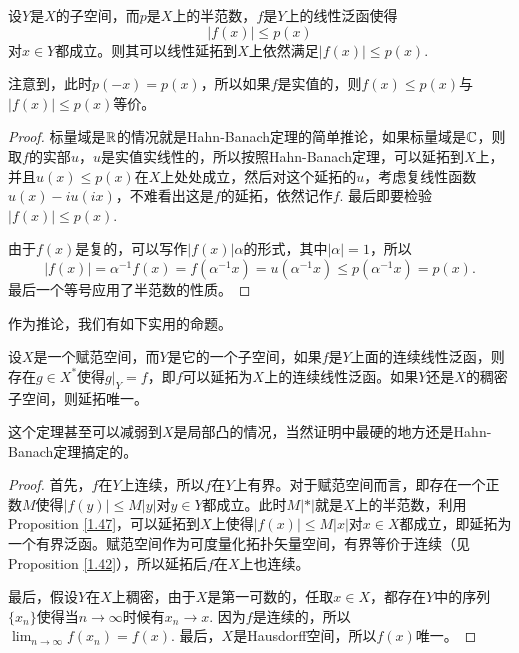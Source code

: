 \begin{pro}\label{1.47}
	设$Y$是$X$的子空间，而$p$是$X$上的半范数，$f$是$Y$上的线性泛函使得
	\[
	|f(x)|\leq p(x)
	\]
	对$x\in Y$都成立。则其可以线性延拓到$X$上依然满足$|f(x)|\leq p(x)$.
\end{pro}

注意到，此时$p(-x)=p(x)$，所以如果$f$是实值的，则$f(x)\leq p(x)$与$|f(x)|\leq p(x)$等价。

\begin{proof}
	标量域是$\mathbb{R}$的情况就是Hahn-Banach定理的简单推论，如果标量域是$\mathbb{C}$，则取$f$的实部$u$，$u$是实值实线性的，所以按照Hahn-Banach定理，可以延拓到$X$上，并且$u(x)\leq p(x)$在$X$上处处成立，然后对这个延拓的$u$，考虑复线性函数$u(x)-i u(i x)$，不难看出这是$f$的延拓，依然记作$f$. 最后即要检验$|f(x)|\leq p(x)$.

	由于$f(x)$是复的，可以写作$|f(x)|\alpha$的形式，其中$|\alpha|=1$，所以
	\[
	|f(x)|=\alpha^{-1}f(x)=f(\alpha^{-1}x)=u(\alpha^{-1}x)\leq p(\alpha^{-1}x)=p(x).
	\]
	最后一个等号应用了半范数的性质。
\end{proof}

作为推论，我们有如下实用的命题。

\begin{pro}\label{1.52}
	设$X$是一个赋范空间，而$Y$是它的一个子空间，如果$f$是$Y$上面的连续线性泛函，则存在$g\in X^*$使得$g|_Y=f$，即$f$可以延拓为$X$上的连续线性泛函。如果$Y$还是$X$的稠密子空间，则延拓唯一。
\end{pro}

这个定理甚至可以减弱到$X$是局部凸的情况，当然证明中最硬的地方还是Hahn-Banach定理搞定的。

\begin{proof}
	首先，$f$在$Y$上连续，所以$f$在$Y$上有界。对于赋范空间而言，即存在一个正数$M$使得$|f(y)|\leq M|y|$对$y\in Y$都成立。此时$M|*|$就是$X$上的半范数，利用Proposition \ref{1.47}，可以延拓到$X$上使得$|f(x)|\leq M|x|$对$x\in X$都成立，即延拓为一个有界泛函。赋范空间作为可度量化拓扑矢量空间，有界等价于连续（见Proposition \ref{1.42}），所以延拓后$f$在$X$上也连续。

	最后，假设$Y$在$X$上稠密，由于$X$是第一可数的，任取$x\in X$，都存在$Y$中的序列$\{x_n\}$使得当$n\to\infty$时候有$x_n\to x$. 因为$f$是连续的，所以$\lim_{n\to\infty}f(x_n)=f(x)$. 最后，$X$是Hausdorff空间，所以$f(x)$唯一。
\end{proof}


